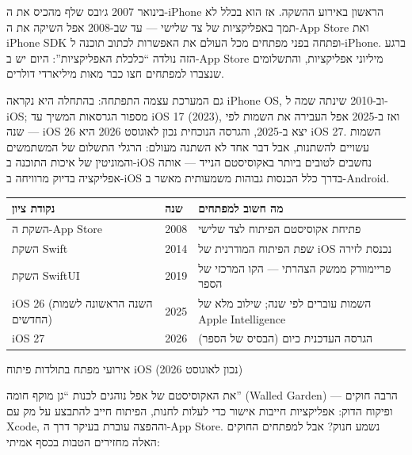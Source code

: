 


בינואר 2007 ג׳ובס שלף מהכיס את ה-iPhone הראשון באירוע ההשקה. אז הוא בכלל לא תמך באפליקציות של צד שלישי — עד שב-2008 אפל השיקה את ה-App Store ואת iPhone SDK ופתחה בפני מפתחים מכל העולם את האפשרות לכתוב תוכנה ל-iPhone. ברגע הזה נולדה “כלכלת האפליקציות”: היום יש ב-App Store מיליוני אפליקציות, והתשלומים שנצברו למפתחים חצו כבר מאות מיליארדי דולרים.

גם המערכת עצמה התפתחה: בהתחלה היא נקראה iPhone OS, וב-2010 שינתה שמה ל-iOS; מספור הגרסאות המשיך עד iOS 17 (2023), ואז ב-2025 אפל העבירה את השמות לפי שנה — iOS 26 יצא ב-2025, והגרסה הנוכחית נכון לאוגוסט 2026 היא iOS 27. השמות עשויים להשתנות, אבל דבר אחד לא השתנה מעולם: הרגלי התשלום של המשתמשים והמוניטין של איכות התוכנה ב-iOS נחשבים לטובים ביותר באקוסיסטם הנייד — אותה אפליקציה בדיוק מרוויחה ב-iOS בדרך כלל הכנסות גבוהות משמעותית מאשר ב-Android.

\begin{center}
\begin{tabularx}{\linewidth}{|X|X|X|}
\hline
\textbf{נקודת ציון} & \textbf{שנה} & \textbf{מה חשוב למפתחים} \tabularnewline
\hline
השקת ה-App Store & 2008 & פתיחת אקוסיסטם הפיתוח לצד שלישי \tabularnewline
השקת Swift & 2014 & שפת הפיתוח המודרנית של iOS נכנסת לזירה \tabularnewline
השקת SwiftUI & 2019 & פריימוורק ממשק הצהרתי — הקו המרכזי של הספר \tabularnewline
iOS 26 (השנה הראשונה לשמות החדשים) & 2025 & השמות עוברים לפי שנה; שילוב מלא של Apple Intelligence \tabularnewline
iOS 27 & 2026 & הגרסה העדכנית כיום (הבסיס של הספר) \tabularnewline
\hline
\end{tabularx}
\end{center}

\begin{center}\small\color{gray}אירועי מפתח בתולדות פיתוח iOS (נכון לאוגוסט 2026)\end{center}


את האקוסיסטם של אפל נוהגים לכנות “גן מוקף חומה” (Walled Garden) — הרבה חוקים ופיקוח הדוק: אפליקציות חייבות אישור כדי לעלות לחנות, הפיתוח חייב להתבצע על מק עם Xcode, וההפצה עוברת בעיקר דרך ה-App Store. נשמע חנוק? אבל למפתחים החוקים האלה מחזירים הטבות בכסף אמיתי:

